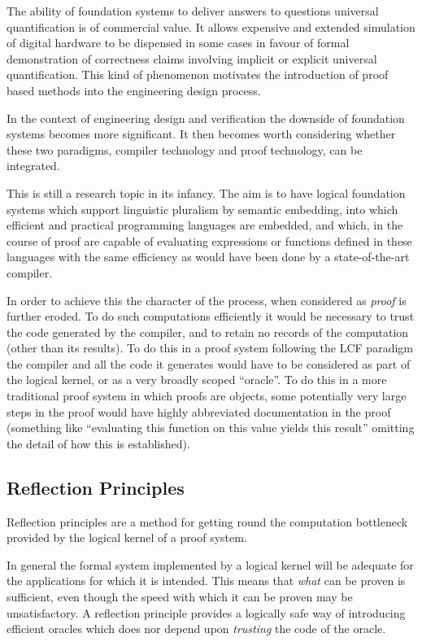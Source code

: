 The ability of foundation systems to deliver answers to questions universal quantification is of commercial value.
It allows expensive and extended simulation of digital hardware to be dispensed in some cases in favour of formal demonstration of correctness claims involving implicit or explicit universal quantification.
This kind of phenomenon motivates the introduction of proof based methods into the engineering design process.

In the context of engineering design and verification the downside of foundation systems becomes more significant.
It then becomes worth considering whether these two paradigms, compiler technology and proof technology, can be integrated.

This is still a research topic in its infancy.
The aim is to have logical foundation systems which support linguistic pluralism by semantic embedding, into which efficient and practical programming languages are embedded, and which, in the course of proof are capable of evaluating expressions or functions defined in these languages with the same efficiency as would have been done by a state-of-the-art compiler.

In order to achieve this the character of the process, when considered as {\it proof} is further eroded.
To do such computations efficiently it would be necessary to trust the code generated by the compiler, and to retain no records of the computation (other than its results).
To do this in a proof system following the LCF paradigm the compiler and all the code it generates would have to be considered as part of the logical kernel, or as a very broadly scoped ``oracle''.
To do this in a more traditional proof system in which proofs are objects, some potentially very large steps in the proof would have highly abbreviated documentation in the proof (something like ``evaluating this function on this value yields this result'' omitting the detail of how this is established).

\subsection{Reflection Principles}

Reflection principles are a method for getting round the computation bottleneck provided by the logical kernel of a proof system.

In general the formal system implemented by a logical kernel will be adequate for the applications for which it is intended.
This means that {\it what} can be proven is sufficient, even though the speed with which it can be proven may be unsatisfactory.
A reflection principle provides a logically safe way of introducing efficient oracles which does nor depend upon {\it trusting} the code of the oracle.

